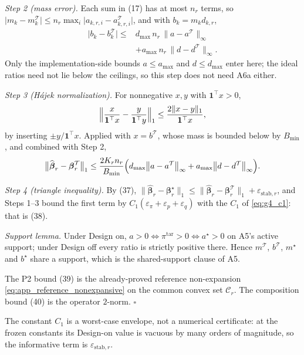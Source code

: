 \emph{Step 2 (mass error).}  Each sum in (17) has at most $n_r$
terms, so
$\lvert m_k-m^{\mathcal T}_{k}\rvert
\le n_r\max_i\lvert a_{k,r,i}-a^{\mathcal T}_{k,r,i}\rvert$, and with
$b_k=m_kd_{k,r}$,
\begin{equation}
\begin{aligned}
 \bigl\lvert b_k-b^{\mathcal T}_k\bigr\rvert
 \le{}&
 d_{\max}\,n_r\,\bigl\|a-a^{\mathcal T}\bigr\|_\infty\\
 &+a_{\max}\,n_r\,\bigl\|d-d^{\mathcal T}\bigr\|_\infty .
\end{aligned}
 \label{eq:app_plugin_mass}
\end{equation}
Only the implementation-side bounds $a\le a_{\max}$ and $d\le d_{\max}$ enter
here; the ideal ratios need not lie below the ceilings, so this step does not
need A6a either.

\emph{Step 3 (H\'ajek normalization).}  For nonnegative $x,y$ with
$\mathbf{1}^{\top}x>0$,
\[
\Bigl\|\frac{x}{\mathbf{1}^{\top}x}
-\frac{y}{\mathbf{1}^{\top}y}\Bigr\|_1
\le\frac{2\|x-y\|_1}{\mathbf{1}^{\top}x},
\]
by inserting $\pm y/\mathbf{1}^{\top}x$.  Applied with $x=b^{\mathcal T}$,
whose mass is bounded below by $B_{\min}$, and combined with Step 2,
\[
\bigl\|\widehat{\boldsymbol\beta}_r
-\boldsymbol\beta_r^{\mathcal T}\bigr\|_1
\le
\frac{2K_rn_r}{B_{\min}}
\Bigl(
d_{\max}\bigl\|a-a^{\mathcal T}\bigr\|_\infty
+a_{\max}\bigl\|d-d^{\mathcal T}\bigr\|_\infty
\Bigr).
\]

\emph{Step 4 (triangle inequality).}  By (37),
$\|\widehat{\boldsymbol\beta}_r-\boldsymbol\beta_r^\star\|_1
\le\|\widehat{\boldsymbol\beta}_r-\boldsymbol\beta_r^{\mathcal T}\|_1
+\varepsilon_{\mathrm{stab},r}$, and Steps 1--3 bound the first term by
$C_1(\varepsilon_\pi+\varepsilon_p+\varepsilon_q)$ with the $C_1$ of
\eqref{eq:g4_c1}: that is (38).

\emph{Support lemma.}  Under Design on,
$a>0\iff\pi^{\mathrm{tar}}>0\iff a^\star>0$ on A5's active support; under
Design off every ratio is strictly positive there.  Hence $m^{\mathcal T}$,
$b^{\mathcal T}$, $m^\star$ and $b^\star$ share a support, which is the
shared-support clause of A5.

The P2 bound (39) is the already-proved reference
non-expansion \eqref{eq:app_reference_nonexpansive} on the common
convex set $\mathcal{C}_r$.  The composition bound
(40) is the operator $2$-norm.
\hfill$\square$

The constant $C_1$ is a worst-case envelope, not a numerical certificate: at
the frozen constants its Design-on value is vacuous by many orders of
magnitude, so the informative term is $\varepsilon_{\mathrm{stab},r}$.


